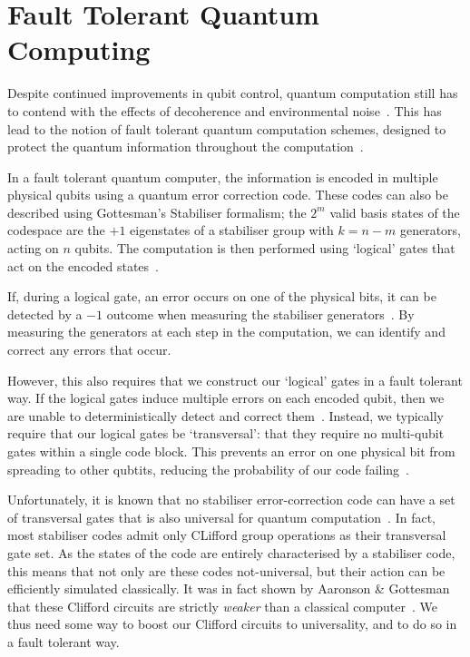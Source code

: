 \documentclass{standalone}
\begin{document}
\section{Fault Tolerant Quantum Computing}\label{sec:FTQC}
Despite continued improvements in qubit control, quantum computation still has to contend with the effects of decoherence and environmental noise~\cite{Nielsen2000}. This has lead to the notion of fault tolerant quantum computation schemes, designed to protect the quantum information throughout the computation~\cite{Nielsen2000}. 
\par
In a fault tolerant quantum computer, the information is encoded in multiple physical qubits using a quantum error correction code. These codes can also be described using Gottesman's Stabiliser formalism; the $2^{m}$ valid basis states of the codespace are the $+1$ eigenstates of a stabiliser group with $k=n-m$ generators, acting on $n$ qubits. The computation is then performed using `logical' gates that act on the encoded states~\cite{Gottesman1997}.
\par
If, during a logical gate,  an error occurs on one of the physical bits, it can be detected by a $-1$ outcome when measuring the stabiliser generators~\cite{Gottesman1997}. By measuring the generators at each step in the computation, we can identify and correct any errors that occur.
\par
However, this also requires that we construct our `logical' gates in a fault tolerant way. If the logical gates induce multiple errors on each encoded qubit, then we are unable to deterministically detect and correct them~\cite{Gottesman2009}. Instead, we typically require that our logical gates be `transversal': that they require no multi-qubit gates within a single code block. This prevents an error on one physical bit from spreading to other qubtits, reducing the probability of our code failing~\cite{Nielsen2000,Gottesman2009}.
\par
Unfortunately, it is known that no stabiliser error-correction code can have a set of transversal gates that is also universal for quantum computation~\cite{Eastin2009}. In fact, most stabiliser codes admit only CLifford group operations as their transversal gate set. As the states of the code are entirely characterised by a stabiliser code, this means that not only are these codes not-universal, but their action can be efficiently simulated classically. It was in fact shown by Aaronson \& Gottesman that these Clifford circuits are strictly \emph{weaker} than a classical computer~\cite{Aaronson2004a}. We thus need some way to boost our Clifford circuits to universality, and to do so in a fault tolerant way. 
\end{document}
